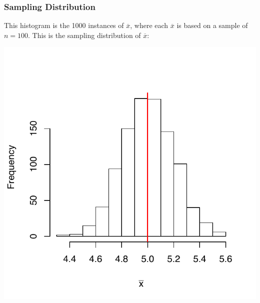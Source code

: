 \documentclass[handout]{beamer}
\newcommand{\blue}[1]{\textcolor{blue2}{#1}}
\newcommand{\xbar}{\overline{x}}
\begin{document}
\begin{frame}[fragile]
\frametitle{Sampling Distribution}
This histogram is the 1000 instances of $\xbar$, where each $\xbar$ is based on a sample of $n=100$.  This is the \blue{sampling distribution} of $\xbar$:
\begin{center}
\includegraphics{figure/lec12-001}
\end{center}
\end{frame}


%
%
%
%
\end{document}
